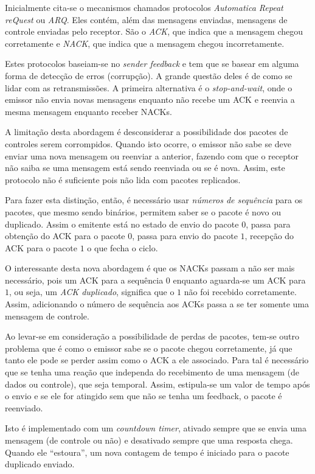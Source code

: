 Inicialmente cita-se o mecanismos chamados protocolos \emph{Automatica Repeat reQuest} ou \emph{ARQ}.
Eles contém, além das mensagens enviadas, mensagens de controle enviadas pelo receptor.
São o \emph{ACK}, que indica que a mensagem chegou corretamente e \emph{NACK}, que indica que a mensagem chegou incorretamente.

Estes protocolos baseiam-se no \emph{sender feedback} e tem que se basear em alguma forma de detecção de erros (corrupção).
A grande questão deles é de como se lidar com as retransmissões. 
A primeira alternativa é o \emph{stop-and-wait}, onde o emissor não envia novas mensagens enquanto não recebe um ACK e reenvia a mesma mensagem enquanto receber NACKs.

A limitação desta abordagem é desconsiderar a possibilidade dos pacotes de controles serem corrompidos.
Quando isto ocorre, o emissor não sabe se deve enviar uma nova mensagem ou reenviar a anterior, fazendo com que o receptor não saiba se uma mensagem está sendo reenviada ou se é nova.
Assim, este protocolo não é suficiente pois não lida com pacotes replicados.

Para fazer esta distinção, então, é necessário usar \emph{números de sequência} para os pacotes, que mesmo sendo binários, permitem saber se o pacote é novo ou duplicado.
Assim o emitente está no estado de envio do pacote $0$, passa para obtenção do ACK para o pacote $0$, passa para envio do pacote $1$, recepção do ACK para o pacote $1$ o que fecha o ciclo.

O interessante desta nova abordagem é que os NACKs passam a não ser mais necessário, pois um ACK para a sequência $0$ enquanto aguarda-se um ACK para $1$, ou seja, um \emph{ACK duplicado}, significa que o $1$ não foi recebido corretamente.
Assim, adicionando o número de sequência aos ACKs passa a se ter somente uma mensagem de controle.

Ao levar-se em consideração a possibilidade de perdas de pacotes, tem-se outro problema que é como o emissor sabe se o pacote chegou corretamente, já que tanto ele pode se perder assim como o ACK a ele associado.
Para tal é necessário que se tenha uma reação que independa do recebimento de uma mensagem (de dados ou controle), que seja temporal.
Assim, estipula-se um valor de tempo após o envio e se ele for atingido sem que não se tenha um feedback, o pacote é reenviado.

Isto é implementado com um \emph{countdown timer}, ativado sempre que se envia uma mensagem (de controle ou não) e desativado sempre que uma resposta chega.
Quando ele ``estoura'', um nova contagem de tempo é iniciado para o pacote duplicado enviado.

